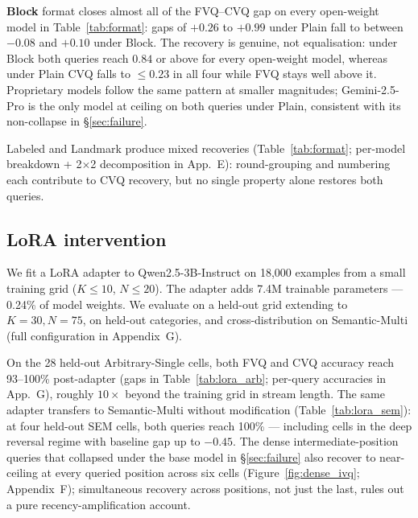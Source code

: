 \documentclass[letterpaper]{article} %
\begin{document}
\begin{table}[t]
\centering
{\small

}\caption{Format-intervention results on Semantic-Multi
($K{=}10, N{=}50$). Each cell shows \textbf{FVQ / CVQ accuracy};
gap $\Delta = $ FVQ $-$ CVQ. Plain is the default condition from
\S\ref{sec:failure}. Wilson half-widths in
Appendix~E.}
\label{tab:format}
\end{table}

\textbf{Block} format closes almost all of the FVQ--CVQ gap on every
open-weight model in Table~\ref{tab:format}: gaps of $+0.26$ to
$+0.99$ under Plain fall to between $-0.08$ and $+0.10$ under Block.
The recovery is genuine, not equalisation: under Block both queries
reach $0.84$ or above for every open-weight model, whereas under
Plain CVQ falls to $\le 0.23$ in all four while FVQ stays well
above it.
Proprietary models follow the same pattern at smaller magnitudes;
Gemini-2.5-Pro is the only model at ceiling on both queries under
Plain, consistent with its non-collapse in \S\ref{sec:failure}.

Labeled and Landmark produce mixed recoveries
(Table~\ref{tab:format}; per-model breakdown + 2$\times$2 decomposition in
App.~E): round-grouping and numbering each
contribute to CVQ recovery, but no single property alone restores
both queries.

\subsection{LoRA intervention}
\label{sec:recoveries:lora}

We fit a LoRA adapter \citep{hu2021lora} to Qwen2.5-3B-Instruct on
18{,}000 examples from a small training grid ($K \le 10$,
$N \le 20$). The adapter adds 7.4M trainable parameters ---
0.24\% of model weights. We evaluate on a held-out grid extending
to $K{=}30, N{=}75$, on held-out categories, and cross-distribution
on Semantic-Multi (full configuration in Appendix~G).

On the 28 held-out Arbitrary-Single cells, both FVQ and CVQ
accuracy reach 93--100\% post-adapter (gaps in
Table~\ref{tab:lora_arb}; per-query accuracies in App.~G),
roughly $10\times$ beyond the training grid in stream length.
The same adapter transfers to Semantic-Multi without modification
(Table~\ref{tab:lora_sem}): at four held-out SEM cells, both
queries reach 100\% --- including cells in the deep reversal
regime with baseline gap up to $-0.45$.
The dense intermediate-position queries that collapsed under the
base model in \S\ref{sec:failure} also recover to near-ceiling at
every queried position across six cells (Figure~\ref{fig:dense_ivq};
Appendix~F); simultaneous recovery across
positions, not just the last, rules out a pure
recency-amplification account.
\end{document}
